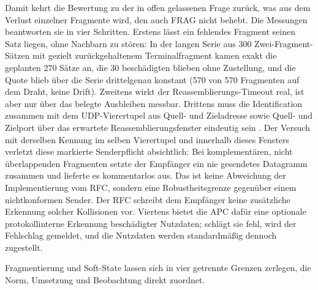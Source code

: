 Damit kehrt die Bewertung zu der in  offen gelassenen Frage zurück, was aus
dem Verlust einzelner Fragmente wird, den auch FRAG nicht behebt. Die Messungen beantworten sie in
vier Schritten. Erstens lässt ein fehlendes Fragment seinen Satz liegen, ohne Nachbarn zu stören: In der
langen Serie aus 300 Zwei-Fragment-Sätzen mit gezielt zurückgehaltenem Terminalfragment kamen exakt
die geplanten 270 Sätze an, die 30 beschädigten blieben ohne Zustellung, und die Quote blieb über die
Serie drittelgenau konstant (570 von 570 Fragmenten auf dem Draht, keine Drift). Zweitens wirkt der
Reassemblierungs-Timeout real, ist aber nur über das belegte Ausbleiben messbar. Drittens muss die
Identification zusammen mit dem UDP-Vierertupel aus Quell- und Zieladresse sowie Quell- und Zielport
über das erwartete Reassemblierungsfenster eindeutig sein \cite[Sec.~11.4]{rfc9868}. Der Versuch mit
derselben Kennung im selben Vierer\-tupel und innerhalb dieses Fensters verletzt diese markierte
Senderpflicht absichtlich: Bei komplementären, nicht überlappenden Fragmenten setzte der Empfänger ein
nie gesendetes Datagramm zusammen und lieferte es kommentarlos aus. Das ist keine Abweichung der
Implementierung vom RFC, sondern eine Robustheitsgrenze gegenüber einem nichtkonformen Sender. Der RFC
schreibt dem Empfänger keine zusätzliche Erkennung solcher Kollisionen vor. Viertens bietet die APC
dafür eine optionale protokollinterne Erkennung beschädigter Nutzdaten; schlägt sie fehl, wird der
Fehlschlag gemeldet, und die Nutzdaten werden standardmäßig dennoch zugestellt.

Fragmentierung und Soft-State lassen sich in vier getrennte Grenzen zerlegen, die
 Norm, Umsetzung und Beobachtung direkt zuordnet.


